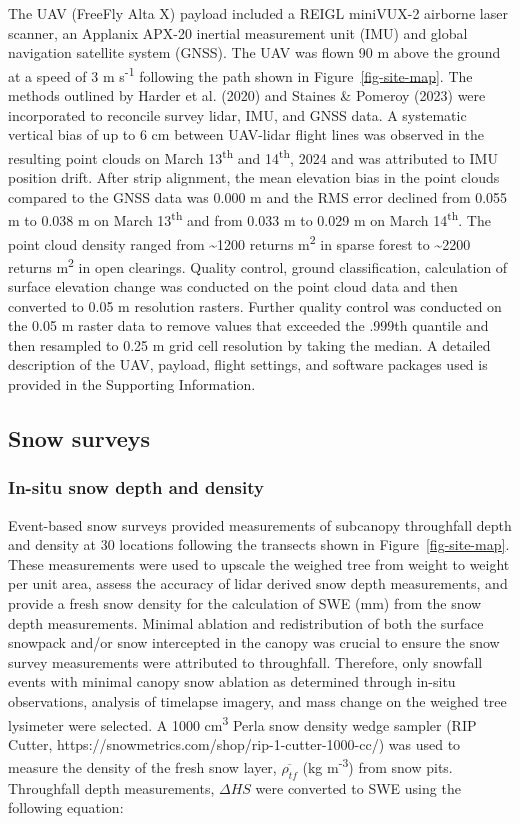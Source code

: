 \documentclass[
  letterpaper,
  DIV=11,
  numbers=noendperiod]{scrartcl}
\begin{document}
The UAV (FreeFly Alta X) payload included a REIGL miniVUX-2 airborne
laser scanner, an Applanix APX-20 inertial measurement unit (IMU) and
global navigation satellite system (GNSS). The UAV was flown 90 m above
the ground at a speed of 3 m s\textsuperscript{-1} following the path
shown in Figure~\ref{fig-site-map}. The methods outlined by Harder et
al. (2020) and Staines \& Pomeroy (2023) were incorporated to reconcile
survey lidar, IMU, and GNSS data. A systematic vertical bias of up to 6
cm between UAV-lidar flight lines was observed in the resulting point
clouds on March 13\textsuperscript{th} and 14\textsuperscript{th}, 2024
and was attributed to IMU position drift. After strip alignment, the
mean elevation bias in the point clouds compared to the GNSS data was
0.000 m and the RMS error declined from 0.055 m to 0.038 m on March
13\textsuperscript{th} and from 0.033 m to 0.029 m on March
14\textsuperscript{th}. The point cloud density ranged from
\textasciitilde1200 returns m\textsuperscript{2} in sparse forest to
\textasciitilde2200 returns m\textsuperscript{2} in open clearings.
Quality control, ground classification, calculation of surface elevation
change was conducted on the point cloud data and then converted to 0.05
m resolution rasters. Further quality control was conducted on the 0.05
m raster data to remove values that exceeded the .999th quantile and
then resampled to 0.25 m grid cell resolution by taking the median. A
detailed description of the UAV, payload, flight settings, and software
packages used is provided in the Supporting Information.

\subsection{Snow surveys}\label{snow-surveys}

\subsubsection{In-situ snow depth and
density}\label{in-situ-snow-depth-and-density}

Event-based snow surveys provided measurements of subcanopy throughfall
depth and density at 30 locations following the transects shown in
Figure~\ref{fig-site-map}. These measurements were used to upscale the
weighed tree from weight to weight per unit area, assess the accuracy of
lidar derived snow depth measurements, and provide a fresh snow density
for the calculation of SWE (mm) from the snow depth measurements.
Minimal ablation and redistribution of both the surface snowpack and/or
snow intercepted in the canopy was crucial to ensure the snow survey
measurements were attributed to throughfall. Therefore, only snowfall
events with minimal canopy snow ablation as determined through in-situ
observations, analysis of timelapse imagery, and mass change on the
weighed tree lysimeter were selected. A 1000 cm\textsuperscript{3} Perla
snow density wedge sampler (RIP Cutter,
https://snowmetrics.com/shop/rip-1-cutter-1000-cc/) was used to measure
the density of the fresh snow layer, \(\overline{\rho_{tf}}\) (kg
m\textsuperscript{-3}) from snow pits. Throughfall depth measurements,
\(\Delta HS\) were converted to SWE using the following equation:
\end{document}
